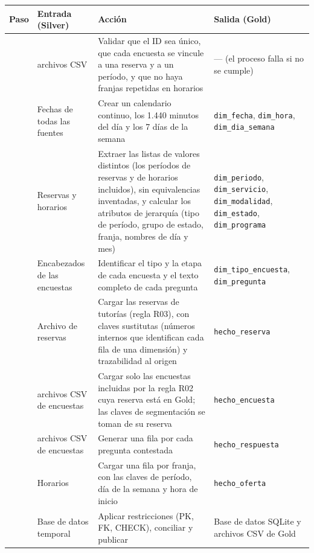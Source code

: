 \documentclass[11pt,letterpaper]{article}
\begin{document}
\begingroup\small\setlength{\tabcolsep}{4pt}\renewcommand{\arraystretch}{1.15}
\begin{longtable}{>{\raggedleft\arraybackslash}p{}>{\raggedright\arraybackslash}p{}>{\raggedright\arraybackslash}p{}>{\raggedright\arraybackslash}p{}}
\toprule
\textbf{Paso} & \textbf{Entrada (Silver)} & \textbf{Acción} & \textbf{Salida (Gold)} \\
\midrule
\endhead
1 & 6 archivos CSV & Validar que el ID sea único, que cada encuesta se vincule a una reserva y a un período, y que no haya franjas repetidas en horarios & --- (el proceso falla si no se cumple) \\
2 & Fechas de todas las fuentes & Crear un calendario continuo, los 1.440 minutos del día y los 7 días de la semana & \texttt{dim\_\allowbreak{}fecha}, \texttt{dim\_\allowbreak{}hora}, \texttt{dim\_\allowbreak{}dia\_\allowbreak{}semana} \\
3 & Reservas y horarios & Extraer las listas de valores distintos (los períodos de reservas y de horarios incluidos), sin equivalencias inventadas, y calcular los atributos de jerarquía (tipo de período, grupo de estado, franja, nombres de día y mes) & \texttt{dim\_\allowbreak{}periodo}, \texttt{dim\_\allowbreak{}servicio}, \texttt{dim\_\allowbreak{}modalidad}, \texttt{dim\_\allowbreak{}estado}, \texttt{dim\_\allowbreak{}programa} \\
4 & Encabezados de las encuestas & Identificar el tipo y la etapa de cada encuesta y el texto completo de cada pregunta & \texttt{dim\_\allowbreak{}tipo\_\allowbreak{}encuesta}, \texttt{dim\_\allowbreak{}pregunta} \\
5 & Archivo de reservas & Cargar las reservas de tutorías (regla R03), con claves sustitutas (números internos que identifican cada fila de una dimensión) y trazabilidad al origen & \texttt{hecho\_\allowbreak{}reserva} \\
6 & 4 archivos CSV de encuestas & Cargar solo las encuestas incluidas por la regla R02 cuya reserva está en Gold; las claves de segmentación se toman de su reserva & \texttt{hecho\_\allowbreak{}encuesta} \\
7 & 4 archivos CSV de encuestas & Generar una fila por cada pregunta contestada & \texttt{hecho\_\allowbreak{}respuesta} \\
8 & Horarios & Cargar una fila por franja, con las claves de período, día de la semana y hora de inicio & \texttt{hecho\_\allowbreak{}oferta} \\
9 & Base de datos temporal & Aplicar restricciones (PK, FK, CHECK), conciliar y publicar & Base de datos SQLite y archivos CSV de Gold \\
\bottomrule
\end{longtable}
\endgroup
\end{document}
